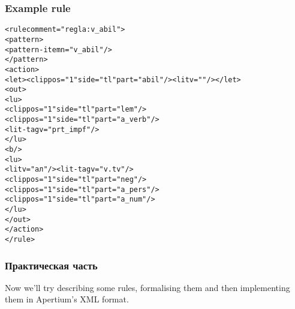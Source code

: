 \documentclass[10pt,xetex]{beamer} %
\begin{document}
\begin{frame}[fragile]
  \frametitle{Example rule}
\vspace{-6pt}
\begin{small}
\begin{alltt}
    <rule comment="regla: v\_{}abil">
      <pattern>
        <pattern-item n="v\_{}abil"/>
      </pattern>
      <action>
        <let><clip pos="1" side="tl" part="abil"/><lit v=""/></let>
        <out>
            <lu>
              <clip pos="1" side="tl" part="lem"/>
              <clip pos="1" side="tl" part="a\_{}verb"/>
              <lit-tag v="prt\_{}impf"/>
            </lu>
            <b/> 
            <lu>
              <lit v="ал"/><lit-tag v="v.tv"/>
              <clip pos="1" side="tl" part="neg"/>
              <clip pos="1" side="tl" part="a\_{}pers"/>
              <clip pos="1" side="tl" part="a\_{}num"/>
            </lu>
        </out>
      </action>
    </rule>

\end{alltt}
\end{small}

\end{frame}

\begin{frame}
  \frametitle{Практическая часть}

Now we'll try describing some rules, formalising them and then implementing them in 
Apertium's XML format.

\end{frame}
\end{document}
